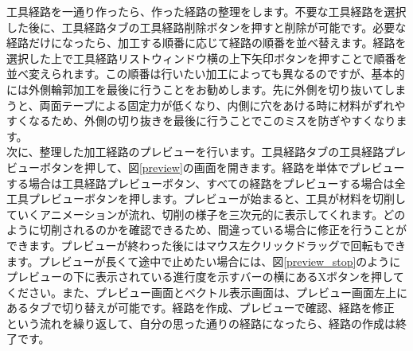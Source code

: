 \documentclass[b5paper, 9pt, twocolumn, titlepage,openany]{jsbook}%
\begin{document}

\clearpage
工具経路を一通り作ったら、作った経路の整理をします。不要な工具経路を選択した後に、工具経路タブの工具経路削除ボタンを押すと削除が可能です。必要な経路だけになったら、加工する順番に応じて経路の順番を並べ替えます。経路を選択した上で工具経路リストウィンドウ横の上下矢印ボタンを押すことで順番を並べ変えられます。この順番は行いたい加工によっても異なるのですが、基本的には外側輪郭加工を最後に行うことをお勧めします。先に外側を切り抜いてしまうと、両面テープによる固定力が低くなり、内側に穴をあける時に材料がずれやすくなるため、外側の切り抜きを最後に行うことでこのミスを防ぎやすくなります。\\

次に、整理した加工経路のプレビューを行います。工具経路タブの工具経路プレビューボタンを押して、図\ref{preview}の画面を開きます。経路を単体でプレビューする場合は工具経路プレビューボタン、すべての経路をプレビューする場合は全工具プレビューボタンを押します。プレビューが始まると、工具が材料を切削していくアニメーションが流れ、切削の様子を三次元的に表示してくれます。どのように切削されるのかを確認できるため、間違っている場合に修正を行うことができます。プレビューが終わった後にはマウス左クリックドラッグで回転もできます。プレビューが長くて途中で止めたい場合には、図\ref{preview_stop}のようにプレビューの下に表示されている進行度を示すバーの横にあるXボタンを押してください。また、プレビュー画面とベクトル表示画面は、プレビュー画面左上にあるタブで切り替えが可能です。経路を作成、プレビューで確認、経路を修正 という流れを繰り返して、自分の思った通りの経路になったら、経路の作成は終了です。\\
\end{document}
